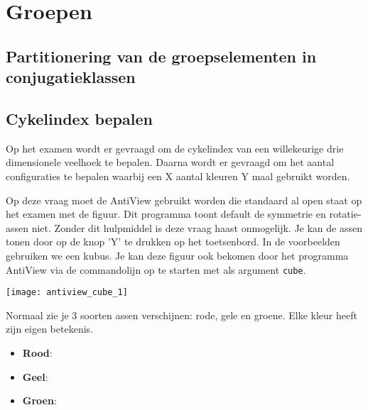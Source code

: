 \section{Groepen}
\subsection{Partitionering van de groepselementen in conjugatieklassen}
\subsection{Cykelindex bepalen}
Op het examen wordt er gevraagd om de cykelindex van een willekeurige drie dimensionele veelhoek te bepalen. Daarna wordt er gevraagd om het aantal configuraties te bepalen waarbij een X aantal kleuren Y maal gebruikt worden.

Op deze vraag moet de AntiView gebruikt worden die standaard al open staat op het examen met de figuur. Dit programma toont default de symmetrie en rotatie-assen niet. Zonder dit hulpmiddel is deze vraag haast onmogelijk. Je kan de assen tonen door op de knop 'Y' te drukken op het toetsenbord. In de voorbeelden gebruiken we een kubus. Je kan deze figuur ook bekomen door het programma AntiView via de commandolijn op te starten met als argument \texttt{cube}.

\begin{center}
 \texttt{[image: antiview\_cube\_1]}
\end{center}

Normaal zie je 3 soorten assen verschijnen: rode, gele en groene. Elke kleur heeft zijn eigen betekenis.
\begin{itemize}
 \item \textbf{Rood}:
 \item \textbf{Geel}:
 \item \textbf{Groen}:
\end{itemize}
